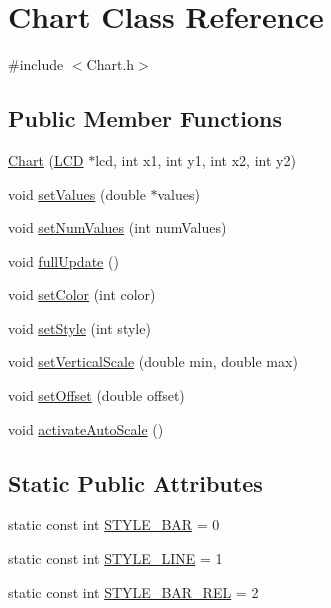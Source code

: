 \hypertarget{class_chart}{
\section{\-Chart \-Class \-Reference}
\label{class_chart}
}


{\ttfamily \#include $<$\-Chart.\-h$>$}

\subsection*{\-Public \-Member \-Functions}
\begin{DoxyCompactItemize}
\item 
\hyperlink{class_chart_a00e865108eeff7fd752f6e7e372be4fe}{\-Chart} (\hyperlink{class_l_c_d}{\-L\-C\-D} $\ast$lcd, int x1, int y1, int x2, int y2)
\item 
void \hyperlink{class_chart_a0d85198e40c99d19de7c1c9e7c6f243d}{set\-Values} (double $\ast$values)
\item 
void \hyperlink{class_chart_a3fee3d36534d20b3abe07b025d619933}{set\-Num\-Values} (int num\-Values)
\item 
void \hyperlink{class_chart_ab3533eaa5137950413298286f3d5da94}{full\-Update} ()
\item 
void \hyperlink{class_chart_a48526bf76895b77b03612c60c791757c}{set\-Color} (int color)
\item 
void \hyperlink{class_chart_aee6075ee66b5e5e462856b596f14985c}{set\-Style} (int style)
\item 
void \hyperlink{class_chart_a8a74426fd855dae79e45c6cde6de7cf0}{set\-Vertical\-Scale} (double min, double max)
\item 
void \hyperlink{class_chart_a2e15bf68d3e96c90fd4fdc36702936f8}{set\-Offset} (double offset)
\item 
void \hyperlink{class_chart_aaec22426bc8c4c86e852c599923d1a1e}{activate\-Auto\-Scale} ()
\end{DoxyCompactItemize}
\subsection*{\-Static \-Public \-Attributes}
\begin{DoxyCompactItemize}
\item 
static const int \hyperlink{class_chart_a96b590d4da6b9cecb76fef8c45a471d8}{\-S\-T\-Y\-L\-E\-\_\-\-B\-A\-R} = 0
\item 
static const int \hyperlink{class_chart_a188d5bd4cd6898300be57056f79f55ba}{\-S\-T\-Y\-L\-E\-\_\-\-L\-I\-N\-E} = 1
\item 
static const int \hyperlink{class_chart_accf3581e81db2e9841c311306963b0e3}{\-S\-T\-Y\-L\-E\-\_\-\-B\-A\-R\-\_\-\-R\-E\-L} = 2
\end{DoxyCompactItemize}


